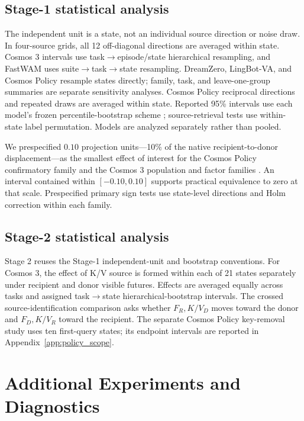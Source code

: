 \documentclass{article}
\newcommand{\kv}{K/V}
\begin{document}
\subsection{Stage-1 statistical analysis}
\label{app:stage1_stats}

The independent unit is a state, not an individual source direction or noise draw. In four-source grids, all 12 off-diagonal directions are averaged within state. Cosmos 3 intervals use task$\rightarrow$episode/state hierarchical resampling, and FastWAM uses suite$\rightarrow$task$\rightarrow$state resampling. DreamZero, LingBot-VA, and Cosmos Policy resample states directly; family, task, and leave-one-group summaries are separate sensitivity analyses. Cosmos Policy reciprocal directions and repeated draws are averaged within state. Reported 95\% intervals use each model's frozen percentile-bootstrap scheme \citep{field2007clusterbootstrap}; source-retrieval tests use within-state label permutation. Models are analyzed separately rather than pooled.

We prespecified $0.10$ projection units---10\% of the native recipient-to-donor displacement---as the smallest effect of interest for the Cosmos Policy confirmatory family and the Cosmos 3 population and factor families \citep{lakens2017equivalence}. An interval contained within $[-0.10,0.10]$ supports practical equivalence to zero at that scale. Prespecified primary sign tests use state-level directions and Holm correction within each family.

\subsection{Stage-2 statistical analysis}
\label{app:stage2_stats}

Stage 2 reuses the Stage-1 independent-unit and bootstrap conventions. For Cosmos 3, the effect of K/V source is formed within each of 21 states separately under recipient and donor visible futures. Effects are averaged equally across tasks and assigned task$\rightarrow$state hierarchical-bootstrap intervals. The crossed source-identification comparison asks whether $F_R,\kv_D$ moves toward the donor and $F_D,\kv_R$ toward the recipient. The separate Cosmos Policy key-removal study uses ten first-query states; its endpoint intervals are reported in Appendix~\ref{app:policy_scope}.

\section{Additional Experiments and Diagnostics}
\label{app:additional}
\end{document}

